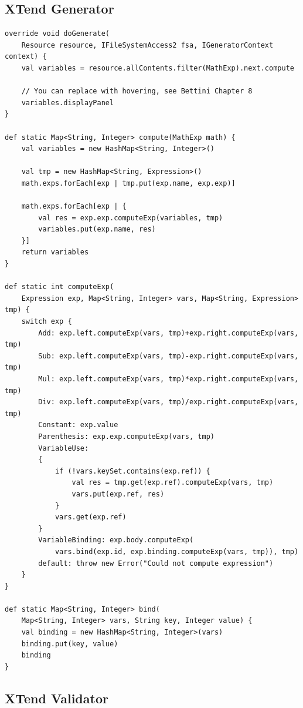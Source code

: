 \documentclass{article}
\begin{document}
\subsection{XTend Generator}
\begin{lstlisting}[language={xtend}, caption={XTend generator}, captionpos={b}]
override void doGenerate(
    Resource resource, IFileSystemAccess2 fsa, IGeneratorContext context) {
    val variables = resource.allContents.filter(MathExp).next.compute
    
    // You can replace with hovering, see Bettini Chapter 8
    variables.displayPanel
}

def static Map<String, Integer> compute(MathExp math) {
    val variables = new HashMap<String, Integer>()
    
    val tmp = new HashMap<String, Expression>()
    math.exps.forEach[exp | tmp.put(exp.name, exp.exp)]
    
    math.exps.forEach[exp | {
        val res = exp.exp.computeExp(variables, tmp)			
        variables.put(exp.name, res)
    }]
    return variables
}

def static int computeExp(
    Expression exp, Map<String, Integer> vars, Map<String, Expression> tmp) {
    switch exp {
        Add: exp.left.computeExp(vars, tmp)+exp.right.computeExp(vars, tmp)
        Sub: exp.left.computeExp(vars, tmp)-exp.right.computeExp(vars, tmp)
        Mul: exp.left.computeExp(vars, tmp)*exp.right.computeExp(vars, tmp)
        Div: exp.left.computeExp(vars, tmp)/exp.right.computeExp(vars, tmp)
        Constant: exp.value
        Parenthesis: exp.exp.computeExp(vars, tmp)
        VariableUse:
        {
            if (!vars.keySet.contains(exp.ref)) {
                val res = tmp.get(exp.ref).computeExp(vars, tmp)
                vars.put(exp.ref, res)
            }
            vars.get(exp.ref)
        }
        VariableBinding: exp.body.computeExp(
            vars.bind(exp.id, exp.binding.computeExp(vars, tmp)), tmp)
        default: throw new Error("Could not compute expression")
    }
}

def static Map<String, Integer> bind(
    Map<String, Integer> vars, String key, Integer value) {
    val binding = new HashMap<String, Integer>(vars)
    binding.put(key, value)
    binding
}
\end{lstlisting}

\subsection{XTend Validator}
\end{document}
